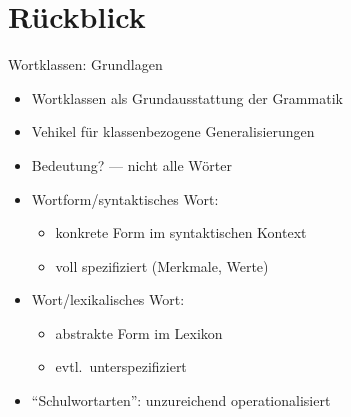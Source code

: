 
\section{Rückblick}

\begin{frame}
  {Wortklassen: Grundlagen}
  \pause
  \begin{itemize}[<+->]
    \item Wortklassen als \alert{Grundausstattung der Grammatik}
    \item Vehikel für klassenbezogene Generalisierungen
    \item Bedeutung? --- nicht alle Wörter
      \Zeile
    \item Wortform\slash syntaktisches Wort:
      \begin{itemize}[<+->]
        \item konkrete Form \alert{im syntaktischen Kontext}
        \item voll spezifiziert (Merkmale, Werte)
      \end{itemize}
      \Zeile
    \item Wort\slash lexikalisches Wort:
      \begin{itemize}[<+->]
        \item abstrakte Form \alert{im Lexikon}
        \item evtl.\ unterspezifiziert
      \end{itemize}
      \Zeile
    \item "`Schulwortarten"': \alert{unzureichend operationalisiert}
  \end{itemize}
\end{frame}


